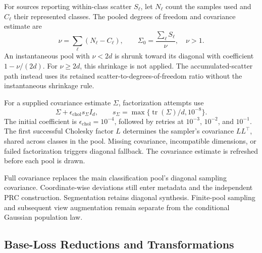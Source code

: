For sources reporting within-class scatter $S_\ell$, let $N_\ell$ count the samples used and $C_\ell$ their represented classes. The pooled degrees of freedom and covariance estimate are
\begin{equation}
 \nu=\sum_\ell(N_\ell-C_\ell),\qquad
 \Sigma_0=\frac{\sum_\ell S_\ell}{\nu},
 \quad \nu>1.
\label{eq:supp_pooled_covariance}
\end{equation}
An instantaneous pool with $\nu<2d$ is shrunk toward its diagonal with coefficient $1-\nu/(2d)$. For $\nu\ge2d$, this shrinkage is not applied. The accumulated-scatter path instead uses its retained scatter-to-degrees-of-freedom ratio without the instantaneous shrinkage rule.

For a supplied covariance estimate $\Sigma$, factorization attempts use
\begin{equation}
 \Sigma+\epsilon_{\mathrm{chol}}s_\Sigma I_d,
 \qquad
 s_\Sigma=\max\{\operatorname{tr}(\Sigma)/d,10^{-8}\}.
\label{eq:supp_cholesky_jitter}
\end{equation}
The initial coefficient is $\epsilon_{\mathrm{chol}}=10^{-4}$, followed by retries at $10^{-3}$, $10^{-2}$, and $10^{-1}$. The first successful Cholesky factor $L$ determines the sampler's covariance $LL^\top$, shared across classes in the pool. Missing covariance, incompatible dimensions, or failed factorization triggers diagonal fallback. The covariance estimate is refreshed before each pool is drawn.

Full covariance replaces the main classification pool's diagonal sampling covariance. Coordinate-wise deviations still enter metadata and the independent PRC construction. Segmentation retains diagonal synthesis. Finite-pool sampling and subsequent view augmentation remain separate from the conditional Gaussian population law.

\subsection{Base-Loss Reductions and Transformations}

